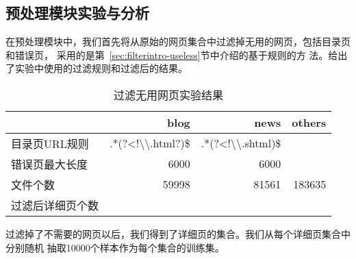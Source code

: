 \subsection{预处理模块实验与分析}
\label{sec:experiement:pre}
在预处理模块中，我们首先将从原始的网页集合中过滤掉无用的网页，包括目录页和错误页，
采用的是第~\ref{sec:filterintro-useless}节中介绍的基于规则的方
法。给出了实验中使用的过滤规则和过滤后的结果。%
\begin{table}[hb]
  \centering
\begin{tabular}{lrrr}
  \toprule
 & blog & news & others \\
\hline
目录页URL规则 & .*(?<!\textbackslash\textbackslash.html?)\$ & .*(?<!\textbackslash\textbackslash.shtml)\$ &  \\
错误页最大长度 & 6000 & 6000 &  \\
文件个数 & 59998 & 81561 & 183635 \\
过滤后详细页个数 &  &  &  \\
\bottomrule
\end{tabular}
  \caption{过滤无用网页实验结果}
  \label{experiment:tab:filter}
\end{table}
\begin{comment}
#+ORGTBL: SEND 过滤无用网页 orgtbl-to-latex :splice nil :skip 0
|                  |                                       blog |                                        news | others |
|------------------+--------------------------------------------+---------------------------------------------+--------|
| 目录页URL规则    | .*(?<!\textbackslash\textbackslash.html?)$ | .*(?<!\textbackslash\textbackslash.s?html)$ |        |
| 错误页最大长度   |                                       6000 |                                        6000 |        |
| 原来总文件个数   |                                      59998 |                                       81561 | 183635 |
| 过滤后详细页个数 |                                      35466 |                                       65655 |        |
\end{comment}

过滤掉了不需要的网页以后，我们得到了详细页的集合。我们从每个详细页集合中分别随机
抽取10000个样本作为每个集合的训练集。

